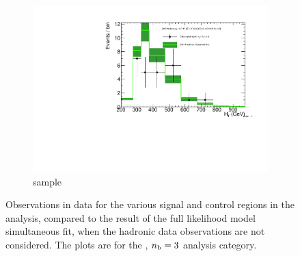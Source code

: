 \begin{figure}[h!]
\begin{subfigure}[b]{0.48\textwidth}
    \includegraphics[width=\textwidth,page=4]
    {Figs/results/v0/greenBand/bestFit_2012dev_RQcdZero_fZinvAll_3b_ge4j-1_smOnly}
    \caption{\mj sample}
  \end{subfigure}
  \caption{Observations in data for the various signal and control
  regions in the analysis, compared to the result of the full likelihood model
  simultaneous fit, when the hadronic data observations are not considered. The
  plots are for the \njhigh, $n_{\text{b}} = 3$ analysis category.}
  \label{fig:green_fits_3b_ge4j}
\end{figure}

